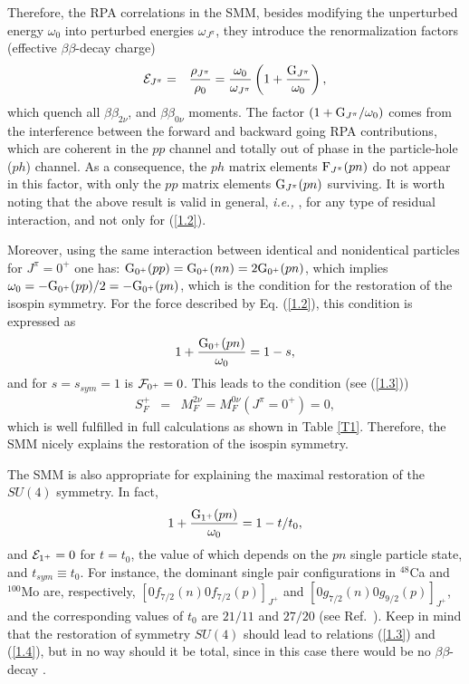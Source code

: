\documentclass[nofootinbib,twocolumn,eqsecnum,floats,aps]{revtex4}
\def\ie{{\it i.e., }}
\def\be{\begin{equation}}
\def\ee{\end{equation}}
\def\br{\begin{eqnarray}}
\def\er{\end{eqnarray}}
\def\rf#1{{(\ref{#1})}}
\def\b {{\beta}}
\begin{document}
{Therefore, the RPA correlations  in the SMM, besides modifying the unperturbed energy $\omega_0$
into  perturbed energies $\omega_{J^\pi}$,  they introduce
the renormalization factors (effective  $\b\b$-decay charge)
\br
{\cal E}_{J^\pi}&=&\frac{\rho_{J^\pi}}{\rho_0}
=\frac{\omega_0}{\omega_{J^\pi}}\left(1+\frac{{\rm G}_{J^\pi}}{\omega_0}\right),
\label{A8}\er
which quench all $\b\b_{2\nu}$, and  $\b\b_{0\nu}$ moments.
The factor $(1+{{\rm G}_{J^\pi}}/{\omega_0})$ comes from the interference
between the forward and backward going RPA contributions, which are
coherent in the $pp$  channel and totally out of phase in the
particle-hole ($ph$)  channel. As a consequence,
the $ph$ matrix elements  ${\rm F}_{J^\pi}(pn)$
do not appear in this  factor, with
only the $pp$ matrix elements  ${\rm G}_{J^\pi}(pn)$  surviving.
It is worth noting  that the above result is valid in general, \ie,
for any type of residual interaction, and not only for \rf{1.2}.

Moreover,  using the same interaction between identical and nonidentical
particles for $J^\pi=0^+$ one has:
${\rm G}_{0^+}(pp)={\rm G}_{0^+}(nn)=2{\rm G}_{0^+}(pn)$,
which implies $\omega_0=-{\rm G}_{0^+}(pp)/2=-{\rm G}_{0^+}(pn)$,
which  is the condition for the restoration of the isospin symmetry.
For the force described by Eq. \rf{1.2}, this condition is expressed as
\be
1+\frac{ {\rm G}_{0^+}(pn)}{\omega_0}=1-s,
\label{A9}\ee
and for  $s=s_{sym }=1$ is ${\cal F}_{0^+}=0$.
This leads to the condition (see \rf{1.3})
\br
S^+_F &=&M_F^{2\nu}= M_F^{0\nu}(J^\pi=0^+) = 0,
\label{A10}\er
which is well fulfilled in full calculations as shown
in Table \ref{T1}. Therefore, the SMM nicely explains the restoration
of the isospin symmetry.

The SMM is also appropriate for  explaining the maximal restoration
of the $SU(4)$ symmetry. In fact,
\be
1+\frac{ {\rm G}_{1^+}(pn)}{\omega_0}=1-t/t_0,
\label{A11}\ee
and ${\cal E}_{1^+}=0$ for $t=t_0$, the value of which depends on
the $pn$ single particle state, and $t_{sym }\equiv t_0$.
For instance, the dominant single pair configurations in   $^{48}$Ca
and $^{100}$Mo are, respectively,
$\left[0f_{7/2}(n)0f_{7/2}(p)\right]_{J^+}$
and $\left[0g_{7/2}(n)0g_{9/2}(p)\right]_{J^+}$, and the corresponding
values of $t_0$
are $21/11$ and $27/20$ (see Ref.~\cite{Krm94a}).
Keep in mind that the restoration of symmetry $SU (4)$ should lead
to relations \rf {1.3} and \rf {1.4}, but in no way should it be
total, since in this case there would be no $\b\b$-decay \cite{Ste15}.

}
\end{document}
